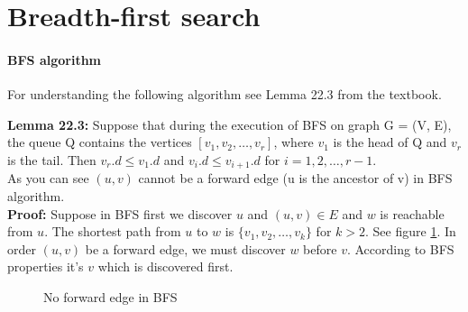 \documentclass{book}
\begin{document}
	\section{Breadth-first search}
	\label{psec:BFSAlgorithm}
	\paragraph{BFS algorithm}
	For understanding the following algorithm see Lemma 22.3 from the textbook.
	
	\textbf{Lemma 22.3: } Suppose that during the execution of BFS on graph G = (V, E), the queue Q contains the vertices $[v_1, v_2, \dots , v_r]$, where $v_1$ is the head of Q and $v_r$ is the tail. Then $v_r.d \le v_1.d$ and $v_i.d \le v_{i+1}.d$ for $i = 1, 2, \dots, r - 1$.\\
			
	As you can see $(u, v)$ cannot be a forward edge (u is the ancestor of v) in BFS algorithm. \\
	
	\textbf{Proof:} Suppose in BFS first we discover $u$ and $(u, v) \in E$ and $w$ is reachable from $u$. The shortest path from $u$ to $w$ is $\{v_1, v_2, \dots, v_k\}$ for $k > 2$. See figure \ref{fig:No forward edge in BFS}. In order $(u, v)$ be a forward edge, we must discover $w$ before $v$. According to BFS properties it's $v$ which is discovered first.
	
	\begin{figure}[h!]
		\centering
		\caption{No forward edge in BFS}
		\label{fig:No forward edge in BFS}
	\end{figure}
	
\end{document}
